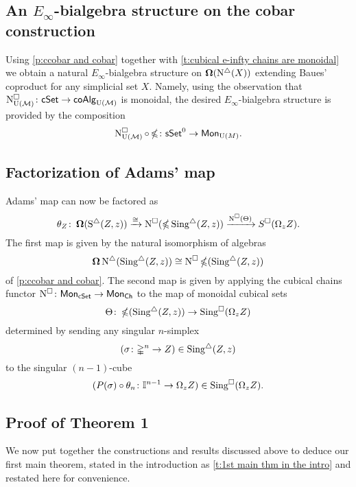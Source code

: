 \subsection{An $E_{\infty}$-bialgebra structure on the cobar construction} \label{ss:e-infty on cobar}

Using \cref{p:ccobar and cobar} together with \cref{t:cubical e-infty chains are monoidal} we obtain a natural $E_{\infty}$-bialgebra structure on $\operatorname{\mathbf{\Omega}}(\operatorname{N^{\triangle}}(X))$ extending Baues' coproduct for any simplicial set $X$.
Namely, using the observation that $\operatorname{N^{\square}_{{\operatorname{U}(\mathcal{M})}}} \colon \mathsf{cSet} \to \mathsf{coAlg}_{{\operatorname{U}(\mathcal{M})}}$ is monoidal, the desired $E_{\infty}$-bialgebra structure is provided by the composition 
$$\operatorname{N^{\square}_{{\operatorname{U}(\mathcal{M})}}} \circ \operatorname{\mathbb{\Omega}} \colon \mathsf{sSet}^0 \to \mathsf{Mon}_{\operatorname{U}(M)}.$$

\subsection{Factorization of Adams' map} \label{factorization}

Adams' map can now be factored as 
$$\theta_Z \colon \operatorname{\mathbf{\Omega}}(\operatorname{S^{\triangle}}(Z, z)) \xrightarrow{\cong} 
\operatorname{N^{\square}}(\operatorname{\mathbb{\Omega}} \operatorname{Sing^{\triangle}}(Z, z)) \xrightarrow{\operatorname{N^{\square}}(\Theta)} 
S^{\square}(\Omega_z Z).$$
The first map is given by the natural isomorphism of algebras $$\operatorname{\mathbf{\Omega}} \operatorname{N^{\triangle}} (\operatorname{Sing^{\triangle}}(Z, z)) \cong  \operatorname{N^{\square}} \operatorname{\mathbb{\Omega}} (\operatorname{Sing^{\triangle}}(Z, z))$$ of \cref{p:ccobar and cobar}.
The second map is given by applying the cubical chains functor $\operatorname{N^{\square}} \colon \mathsf{Mon}_{\mathsf{cSet}} \to \mathsf{Mon}_{\mathsf{Ch}}$ to the map of monoidal cubical sets
$$\Theta \colon \operatorname{\mathbb{\Omega}} (\operatorname{Sing^{\triangle}}(Z, z) )\to \operatorname{Sing^{\square}}( \Omega_z Z)$$
determined by sending any singular $n$-simplex $$(\sigma\colon \mathbb{\Delta}^n \to Z) \in \operatorname{Sing^{\triangle}}(Z, z)$$ to the singular $(n-1)$-cube $$(P(\sigma) \circ \theta_n \colon \mathbb{I}^{n-1} \to \Omega_z Z) \in \operatorname{Sing^{\square}}( \Omega_z Z).$$ 

\subsection{Proof of Theorem 1}

We now put together the constructions and results discussed above to deduce our first main theorem, stated in the introduction as \cref{t:1st main thm in the intro} and restated here for convenience.

